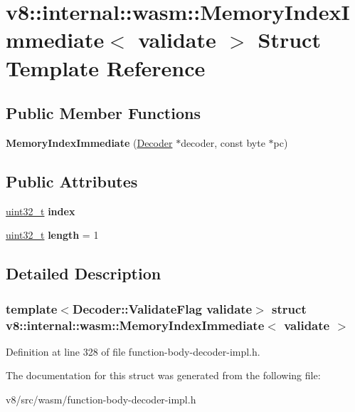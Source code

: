 \hypertarget{structv8_1_1internal_1_1wasm_1_1MemoryIndexImmediate}{}\section{v8\+:\+:internal\+:\+:wasm\+:\+:Memory\+Index\+Immediate$<$ validate $>$ Struct Template Reference}
\label{structv8_1_1internal_1_1wasm_1_1MemoryIndexImmediate}
\subsection*{Public Member Functions}
\begin{DoxyCompactItemize}
\item 
\mbox{\label{structv8_1_1internal_1_1wasm_1_1MemoryIndexImmediate_a48c6666efea5a4868498d0ce78a32e18}} 
{\bfseries Memory\+Index\+Immediate} (\mbox{\hyperlink{classv8_1_1internal_1_1wasm_1_1Decoder}{Decoder}} $\ast$decoder, const byte $\ast$pc)
\end{DoxyCompactItemize}
\subsection*{Public Attributes}
\begin{DoxyCompactItemize}
\item 
\mbox{\label{structv8_1_1internal_1_1wasm_1_1MemoryIndexImmediate_a1d05e928f01ce7274df0417ae3f7d55d}} 
\mbox{\hyperlink{classuint32__t}{uint32\+\_\+t}} {\bfseries index}
\item 
\mbox{\label{structv8_1_1internal_1_1wasm_1_1MemoryIndexImmediate_ae5e4c59014230c36a5c14d11af2a1743}} 
\mbox{\hyperlink{classuint32__t}{uint32\+\_\+t}} {\bfseries length} = 1
\end{DoxyCompactItemize}


\subsection{Detailed Description}
\subsubsection*{template$<$Decoder\+::\+Validate\+Flag validate$>$\newline
struct v8\+::internal\+::wasm\+::\+Memory\+Index\+Immediate$<$ validate $>$}



Definition at line 328 of file function-\/body-\/decoder-\/impl.\+h.



The documentation for this struct was generated from the following file\+:\begin{DoxyCompactItemize}
\item 
v8/src/wasm/function-\/body-\/decoder-\/impl.\+h\end{DoxyCompactItemize}
